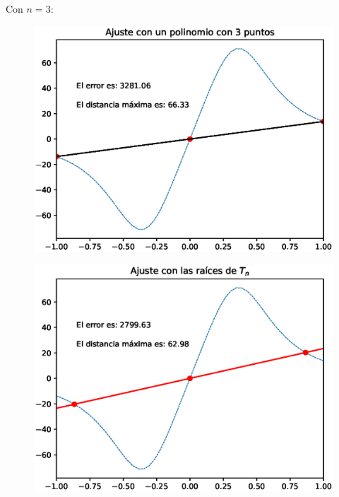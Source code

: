 \documentclass[12pt]{article}
\numberwithin{equation}{section}
\begin{document}
\newpage

Con $n = 3$:
\\
\begin{minipage}{0.45\linewidth}
    \begin{figure}[H]
    \centering
    \includegraphics[scale=0.44]{Imagenes/Interpolacion_Chebychev_03_Polinomio.eps}
\end{figure}       
\end{minipage}
\hspace{0.1cm}
\begin{minipage}{0.45\linewidth}
\begin{figure}[H]
    \centering
    \includegraphics[scale=0.44]{Imagenes/Interpolacion_Chebychev_03_Raices.eps}
\end{figure}
\end{minipage}
\end{document}
